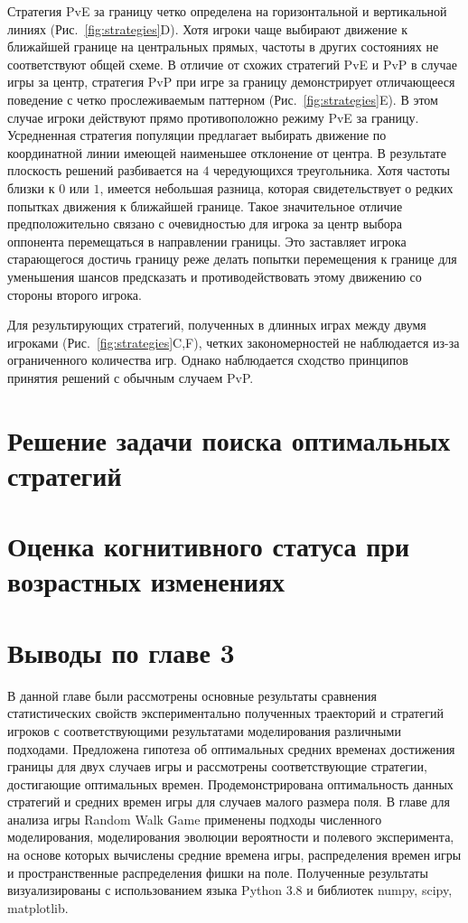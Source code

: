 Стратегия PvE за границу четко определена на горизонтальной и вертикальной линиях (Рис.~\cref{fig:strategies}D). 
Хотя игроки чаще выбирают движение к ближайшей границе на центральных прямых, частоты в других состояниях не соответствуют общей схеме. 
В отличие от схожих стратегий PvE и PvP в случае игры за центр, стратегия PvP при игре за границу демонстрирует отличающееся поведение с четко прослеживаемым паттерном 
(Рис.~\cref{fig:strategies}E). 
В этом случае игроки действуют прямо противоположно режиму PvE за границу. Усредненная стратегия популяции предлагает выбирать движение 
по координатной линии имеющей наименьшее отклонение от центра. В результате плоскость решений разбивается на $4$ чередующихся треугольника. 
Хотя частоты близки к $0$ или $1$, имеется небольшая разница, которая свидетельствует о редких попытках движения к ближайшей границе.
Такое значительное отличие предположительно связано с очевидностью для игрока за центр выбора оппонента перемещаться в направлении границы.
Это заставляет игрока старающегося достичь границу реже делать попытки перемещения к границе для уменьшения шансов предсказать и противодействовать этому движению
со стороны второго игрока.

Для результирующих стратегий, полученных в длинных играх между двумя игроками (Рис.~\cref{fig:strategies}C,F), 
четких закономерностей не наблюдается из-за ограниченного количества игр. 
Однако наблюдается сходство принципов принятия решений с обычным случаем PvP.


\section{Решение задачи поиска оптимальных стратегий}\label{sec:ch3/sec4}

\section{Оценка когнитивного статуса при возрастных изменениях}\label{sec:ch3/sec5}

\section{Выводы по главе 3}\label{sec:ch3/sec6}

В данной главе были рассмотрены основные результаты сравнения статистических свойств экспериментально
полученных траекторий и стратегий игроков с соответствующими результатами моделирования различными подходами. 
Предложена гипотеза об оптимальных средних временах достижения границы для двух случаев игры и 
рассмотрены соответствующие стратегии, достигающие оптимальных времен. Продемонстрирована оптимальность
данных стратегий и средних времен игры для случаев малого размера поля.
В главе для анализа игры Random Walk Game применены подходы численного моделирования, моделирования эволюции вероятности и полевого эксперимента,
на основе которых вычислены средние времена игры, распределения времен игры и пространственные распределения фишки на поле. 
Полученные результаты визуализированы с использованием языка Python 3.8 и библиотек numpy, scipy, matplotlib.

